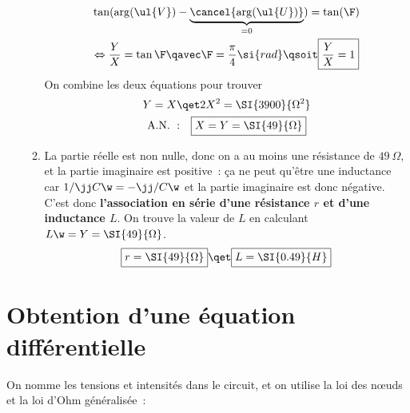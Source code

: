 \documentclass[a4paper, 12pt, final, garamond]{book}
\begin{document}
\begin{enumerate}
\begin{enumerate}
\begin{gather*}
			            \tan(\arg(\ul{V}) -
			            \underbrace{\cancel{\arg(\ul{U})}}_{=0}) = \tan(\F)\\
			            \Leftrightarrow
			            \frac{Y}{X} = \tan\F
			            \qavec
			            \F = \frac{\pi}{4}\si{rad}
			            \qsoit
			            \boxed{\frac{Y}{X} = 1}
		            \end{gather*}
		            On combine les deux équations pour trouver
		            \begin{gather*}
			            Y = X
			            \qet
			            2X^2 = \SI{3900}{\Omega^2}\\
			            \mathrm{A.N.~:}\quad
			            \boxed{X = Y = \SI{49}{\Omega}}
		            \end{gather*}
		      \item La partie réelle est non nulle, donc on a au moins une
		            résistance de $\SI{49}{\Omega}$, et la partie imaginaire est
		            positive~: ça ne peut qu'être une inductance car $1/\jj C\w =
			            -\jj/C\w$ et la partie imaginaire est donc négative. C'est donc
		            \textbf{l'association en série d'une résistance $r$ et d'une
			            inductance $L$}. On trouve
		            la valeur de $L$ en calculant $L\w = Y = \SI{49}{\Omega}$.
		            \[
			            \boxed{r = \SI{49}{\Omega}}
			            \qet
			            \boxed{L = \SI{0.49}{H}}
		            \]
	      \end{enumerate}
\end{enumerate}

\section{Obtention d'une équation différentielle}
On nomme les tensions et intensités dans le circuit, et on utilise la loi des
nœuds et la loi d'Ohm généralisée~:
\end{document}
